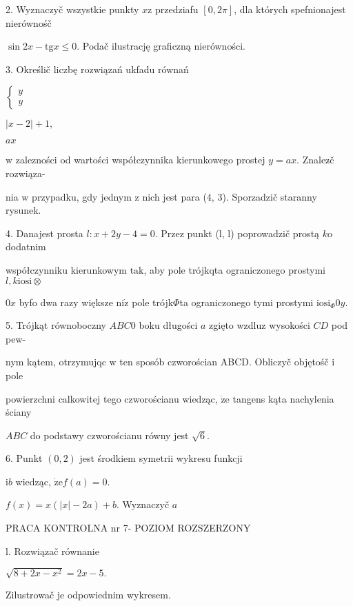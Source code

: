 \documentclass[a4paper,12pt]{article}
\begin{document}
2. Wyznaczyč wszystkie punkty $x\mathrm{z}$ przedziafu $[0,2\pi]$, dla których spefnionajest nierównośč

$\sin 2x-\mathrm{t}\mathrm{g}x\leq 0$. Podač ilustrację graficzną nierówności.

3. Określič liczbę rozwiązań ukfadu równań

$\left\{\begin{array}{l}
y\\
y
\end{array}\right.$

$|x-2|+1,$

$ax$

$\mathrm{w}$ zalezności od wartości współczynnika kierunkowego prostej $y=ax$. Znalez$\acute{}$č rozwiąza-

nia $\mathrm{w}$ przypadku, gdy jednym $\mathrm{z}$ nich jest para (4, 3). Sporzadzič staranny rysunek.

4. Danajest prosta $l:x+2y-4=0$. Przez punkt (l, l) poprowadzič prostą $k\mathrm{o}$ dodatnim

współczynniku kierunkowym $\mathrm{t}\mathrm{a}\mathrm{k}$, aby pole trójkqta ograniczonego prostymi $l,  k\mathrm{i}\mathrm{o}\mathrm{s}\mathrm{i}\otimes$

$0x$ byfo dwa razy większe $\mathrm{n}\mathrm{i}\dot{\mathrm{z}}$ pole trójk$\Phi$ta ograniczonego tymi prostymi $\mathrm{i}\mathrm{o}\mathrm{s}\mathrm{i}_{\Phi}0y.$

5. Trójkąt równoboczny $ABC0$ boku długości $a$ zgięto wzdluz wysokości $CD$ pod pew-

nym kątem, otrzymujqc $\mathrm{w}$ ten sposób czworościan ABCD. Obliczyč objętośč $\mathrm{i}$ pole

powierzchni calkowitej tego czworościanu wiedząc, $\dot{\mathrm{z}}\mathrm{e}$ tangens kąta nachylenia ściany

$ABC$ do podstawy czworościanu równy jest $\sqrt{6}.$

6. Punkt $(0,2)$ jest środkiem symetrii wykresu funkcji

$\mathrm{i}b$ wiedząc, $\dot{\mathrm{z}}\mathrm{e} f(a)=0.$

$f(x)=x(|x|-2a)+b$. Wyznaczyč $a$





PRACA KONTROLNA nr 7- POZIOM ROZSZERZONY

l. Rozwiązač równanie

$\sqrt{8+2x-x^{2}}=2x-5.$

Zilustrowač je odpowiednim wykresem.
\end{document}
